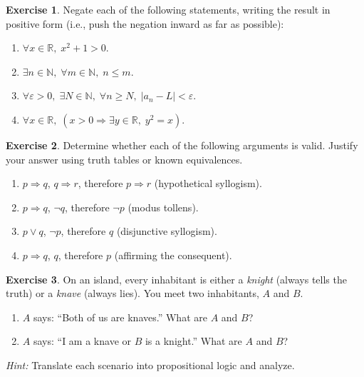 \documentclass[12pt,a4paper,openany]{book}
\theoremstyle{definition}
\newtheorem{exercise}{Exercise}[chapter]
\theoremstyle{plain}
\theoremstyle{remark}
\newcommand{\N}{\mathbb{N}}
\newcommand{\R}{\mathbb{R}}
\newcommand{\abs}[1]{\left|#1\right|}
\begin{document}
\begin{exercise}
\label{exer:negate-statements}
Negate each of the following statements, writing the result in positive form
(i.e., push the negation inward as far as possible):
\begin{enumerate}[label=(\alph*),nosep]
  \item $\forall x \in \R,\; x^2 + 1 > 0$.
  \item $\exists n \in \N,\; \forall m \in \N,\; n \leq m$.
  \item $\forall \varepsilon > 0,\; \exists N \in \N,\; \forall n \geq N,\;
        \abs{a_n - L} < \varepsilon$.
  \item $\forall x \in \R,\; (x > 0 \Rightarrow \exists y \in \R,\; y^2 = x)$.
\end{enumerate}
\end{exercise}

\begin{exercise}
\label{exer:logical-arguments}
Determine whether each of the following arguments is valid. Justify your answer
using truth tables or known equivalences.
\begin{enumerate}[label=(\alph*),nosep]
  \item $p \Rightarrow q$, $q \Rightarrow r$, therefore $p \Rightarrow r$
        (hypothetical syllogism).
  \item $p \Rightarrow q$, $\lnot q$, therefore $\lnot p$
        (modus tollens).
  \item $p \lor q$, $\lnot p$, therefore $q$
        (disjunctive syllogism).
  \item $p \Rightarrow q$, $q$, therefore $p$
        (affirming the consequent).
\end{enumerate}
\end{exercise}

\begin{exercise}
\label{exer:knights-knaves}
On an island, every inhabitant is either a \emph{knight} (always tells the truth)
or a \emph{knave} (always lies). You meet two inhabitants, $A$ and $B$.
\begin{enumerate}[label=(\alph*),nosep]
  \item $A$ says: ``Both of us are knaves.'' What are $A$ and $B$?
  \item $A$ says: ``I am a knave or $B$ is a knight.'' What are $A$ and $B$?
\end{enumerate}
\emph{Hint:} Translate each scenario into propositional logic and analyze.
\end{exercise}
\end{document}
